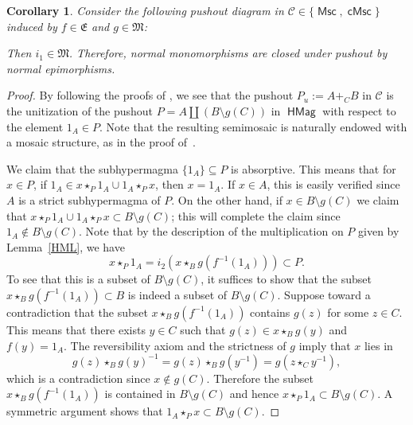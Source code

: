 \documentclass[reqno]{amsart}
\newcommand{\cat}[1]{\ensuremath{\mathsf{#1}}}
\newcommand{\cC}{\ensuremath{\mathcal{C}}}
\DeclareMathOperator{\HMag}{\cat{HMag}}
\DeclareMathOperator{\Msc}{\cat{Msc}}
\DeclareMathOperator{\cMsc}{\cat{cMsc}}
\numberwithin{equation}{section}
\theoremstyle{plain}
\newtheorem{corollary}[equation]{Corollary}
\theoremstyle{definition}
\begin{document}
\begin{corollary}\label{cor:pushout}
Consider the following pushout diagram in $\cC \in \{\Msc, \cMsc\}$ induced by $f\in\mathfrak{E}$ and $g\in\mathfrak{M}$:
\begin{center}
\end{center}
Then $i_1\in\mathfrak{M}$. Therefore, normal monomorphisms are closed under pushout by normal epimorphisms.
\end{corollary}
\begin{proof}
By following the proofs of \cite[Theorems~3.11, 4.1]{NakamuraReyes}, we see that the pushout $P_u:=A+_CB$ in $\cC$ is the unitization of the pushout $P=A\coprod (B\setminus g(C))$ in $\HMag$ with respect to the element $1_A\in P$. Note that the resulting semimosaic is naturally endowed with a mosaic structure, as in the proof of~\cite[Theorem~4.1]{NakamuraReyes}.

We claim that the subhypermagma $\{1_A\} \subseteq P$ is absorptive. This means that for $x \in P$, if $1_A \in x \star_P 1_A \cup 1_A \star_P x$, then $x = 1_A$. If $x \in A$, this is easily verified since $A$ is a strict subhypermagma of $P$. On the other hand, if $x \in B \setminus g(C)$ we claim that $x\star_P1_A\cup 1_A\star_Px\subset B\setminus g(C)$; this will complete the claim since $1_A \notin B \setminus g(C)$.
Note that by the description of the multiplication on $P$ given by Lemma~\ref{HML}, we have 
$$x\star_P1_A=i_2(x\star_Bg(f^{-1}(1_A)))\subset P.$$
To see that this is a subset of $B\setminus g(C)$, it suffices to show that the subset $x\star_Bg(f^{-1}(1_A))\subset B$ is indeed a subset of $B\setminus g(C)$. Suppose toward a contradiction that the subset $x\star_Bg(f^{-1}(1_A))$ contains $g(z)$ for some $z\in C$. This means that there exists $y\in C$ such that $g(z)\in x\star_Bg(y)$ and $f(y)=1_A$. The reversibility axiom and the strictness of $g$ imply that $x$ lies in $$g(z)\star_Bg(y)^{-1}=g(z)\star_Bg(y^{-1})=g(z\star_C y^{-1}),$$
which is a contradiction since $x\notin g(C)$.
Therefore the subset $x\star_Bg(f^{-1}(1_A))$ is contained in $B\setminus g(C)$ and hence $x\star_P1_A\subset B\setminus g(C)$. A symmetric argument shows that $1_A\star_Px\subset B\setminus g(C)$.



\end{proof}
\end{document}
